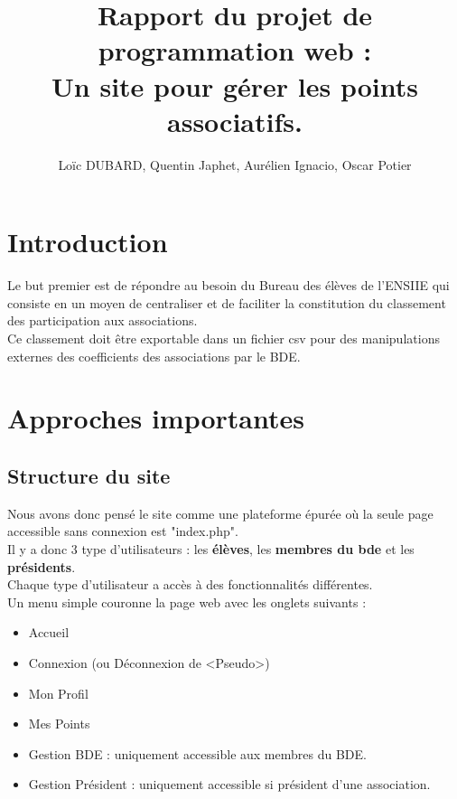 \documentclass[french]{article}
\author{Loïc DUBARD, Quentin Japhet, Aurélien Ignacio, Oscar Potier}
\title{Rapport du projet de programmation web : \\
\textbf{Un site pour gérer les points associatifs}.}
\begin{document}
\maketitle
\tableofcontents
\clearpage
\section*{Introduction}
Le but premier est de répondre au besoin du Bureau des élèves de l'ENSIIE qui consiste en un moyen de centraliser et de faciliter la constitution du classement des participation aux associations.\\

 Ce classement doit être exportable dans un fichier csv pour des manipulations externes des coefficients des associations par le BDE.\\
 
 \clearpage
 
\section{Approches importantes}
\subsection{Structure du site}
Nous avons donc pensé le site comme une plateforme épurée où la seule page accessible sans connexion est "index.php".\\
 Il y a donc 3 type d'utilisateurs : les \textbf{élèves}, les \textbf{membres du bde} et les \textbf{présidents}.\\ Chaque type d'utilisateur a accès à des fonctionnalités différentes.\\ 
 
 Un menu simple couronne la page web avec les onglets suivants : 
 \begin{itemize}
 	\item Accueil
 	\item Connexion (ou Déconnexion de <Pseudo>) 
 	\item Mon Profil
 	\item Mes Points
 	\item Gestion BDE : uniquement accessible aux membres du BDE.
 	\item Gestion Président : uniquement accessible si président d'une association.
 \end{itemize}
 
\end{document}
